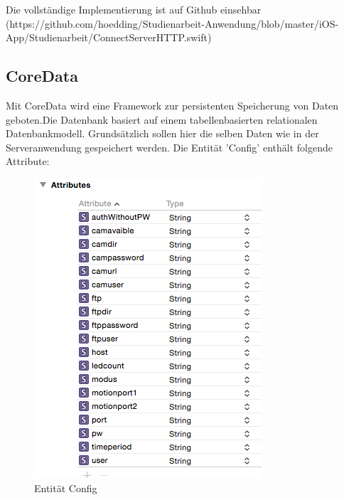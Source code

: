 Die vollständige Implementierung ist auf Github einsehbar (https://github.com/hoedding/Studienarbeit-Anwendung/blob/master/iOS-App/Studienarbeit/ConnectServerHTTP.swift)

\subsection{CoreData}
Mit CoreData wird eine Framework zur persistenten Speicherung von Daten geboten.Die Datenbank basiert auf einem tabellenbasierten relationalen Datenbankmodell. Grundsätzlich sollen hier die selben Daten wie in der Serveranwendung gespeichert werden. Die Entität 'Config' enthält folgende Attribute:

\begin{figure}[h]
	\begin{minipage}{0.5\textwidth}
		\centering
		\includegraphics[width=\textwidth]{./data/entityconfig.png}
		\caption{Entität Config}
	\end{minipage}
\end{figure}

